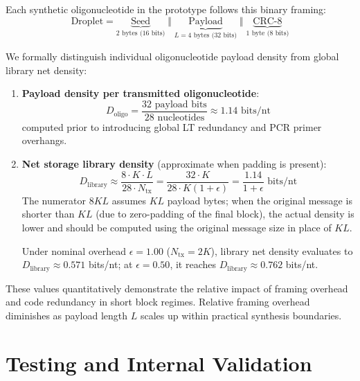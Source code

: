 Each synthetic oligonucleotide in the prototype follows this binary framing:
\begin{equation}
    \text{Droplet} = \underbrace{\text{Seed}}_{\text{2 bytes (16 bits)}} \;\Vert\; \underbrace{\text{Payload}}_{\text{$L = 4$ bytes (32 bits)}} \;\Vert\; \underbrace{\text{CRC-8}}_{\text{1 byte (8 bits)}}
\end{equation}

We formally distinguish individual oligonucleotide payload density from global library net density:
\begin{enumerate}
    \item \textbf{Payload density per transmitted oligonucleotide}:
    \begin{equation}
        \label{eq:densidade_oligo}
        D_{\text{oligo}} = \frac{32 \text{ payload bits}}{28 \text{ nucleotides}} \approx 1.14 \text{ bits/nt}
    \end{equation}
    computed prior to introducing global LT redundancy and PCR primer overhangs.
    
    \item \textbf{Net storage library density} (approximate when padding is present):
    \begin{equation}
        \label{eq:densidade_biblioteca}
        D_{\text{library}} \approx \frac{8 \cdot K \cdot L}{28 \cdot N_{\text{tx}}} = \frac{32 \cdot K}{28 \cdot K(1 + \epsilon)} = \frac{1.14}{1 + \epsilon} \text{ bits/nt}
    \end{equation}
    The numerator $8KL$ assumes $KL$ payload bytes; when the original message is shorter than $KL$ (due to zero-padding of the final block), the actual density is lower and should be computed using the original message size in place of $KL$.
    
    Under nominal overhead $\epsilon = 1.00$ ($N_{\text{tx}} = 2K$), library net density evaluates to $D_{\text{library}} \approx 0.571$ bits/nt; at $\epsilon = 0.50$, it reaches $D_{\text{library}} \approx 0.762$ bits/nt.
\end{enumerate}
These values quantitatively demonstrate the relative impact of framing overhead and code redundancy in short block regimes. Relative framing overhead diminishes as payload length $L$ scales up within practical synthesis boundaries.

\section{Testing and Internal Validation}
\label{sec:testing_and_validation}

